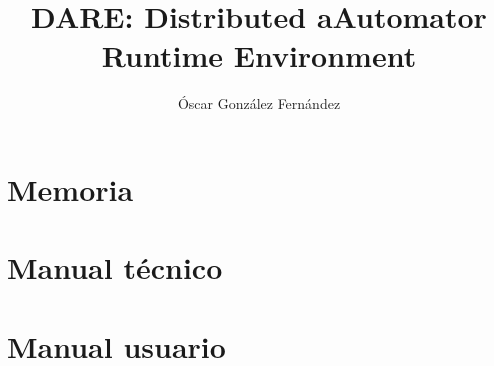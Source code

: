 \documentclass[a4paper,12pt,twoside]{report}
\author{Óscar González Fernández}
\title{DARE: Distributed aAutomator Runtime Environment}
\begin{document}
\maketitle
\tableofcontents
\chapter{Memoria}

\chapter{Manual técnico}

\chapter{Manual usuario}

\end{document}
